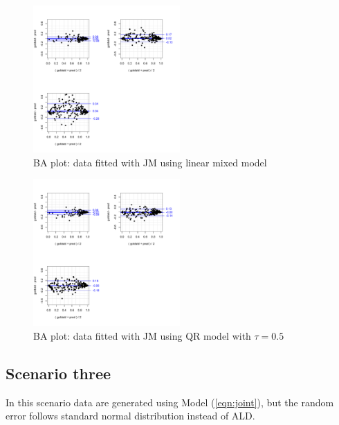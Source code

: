 \documentclass{article}
\begin{document}
\begin{figure}[H]
\centering
\includegraphics[width=0.5\textwidth]{ba_LMJM_qt50data.pdf}
\caption{BA plot: data fitted with JM using linear mixed model}
\end{figure}

\begin{figure}[H]
\centering
\includegraphics[width=0.5\textwidth]{ba_QRJM_qt50data.pdf}
\caption{BA plot: data fitted with JM using QR model with $\tau=0.5$}
\end{figure}


\subsection{Scenario three}
In this scenario data are generated using Model (\ref{eqn:joint}), but the random error follows standard normal distribution instead of ALD.
\end{document}
